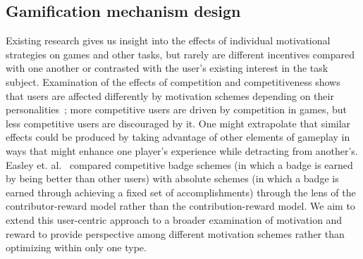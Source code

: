 \subsection{Gamification mechanism design}
Existing research gives us insight into the effects of individual motivational strategies on games and other tasks, but rarely are different incentives compared with one another or contrasted with the user's existing interest in the task subject. Examination of the effects of competition and competitiveness shows that users are affected differently by motivation schemes depending on their personalities~\cite{Song13}; more competitive users are driven by competition in games, but less competitive users are discouraged by it. One might extrapolate that similar effects could be produced by taking advantage of other elements of gameplay in ways that might enhance one player's experience while detracting from another's. Easley et. al.~\cite{Easley13} compared competitive badge schemes (in which a badge is earned by being better than other users) with absolute schemes (in which a badge is earned through achieving a fixed set of accomplishments) through the lens of the contributor-reward model rather than the contribution-reward model. We aim to extend this user-centric approach to a broader examination of motivation and reward to provide perspective among different motivation schemes rather than optimizing within only one type.
